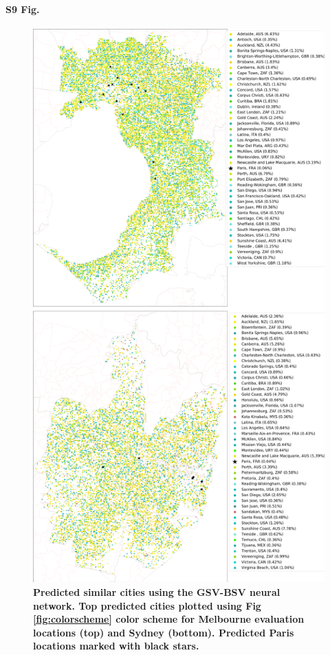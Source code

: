 \documentclass[10pt,letterpaper]{article}
\begin{document}
\paragraph*{S9 Fig.}
\begin{figure}[!htbp]
\centering    
\includegraphics[scale=0.16]{Images/PlosOne/Fig9.png} 
\caption{\bf Predicted similar cities using the GSV-BSV neural network. Top predicted cities plotted using Fig \ref{fig:colorscheme} color scheme for Melbourne evaluation locations (top) and Sydney (bottom). Predicted Paris locations marked with black stars.}   
 \label{fig:melstreet}  
\end{figure}
\end{document}
